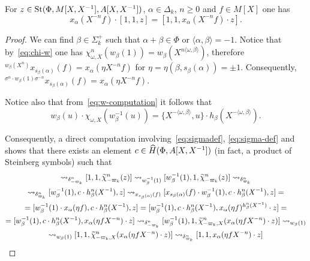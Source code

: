 \begin{lemma} \label{lem:family2}
    For $z \in \operatorname{St}(\Phi, M[X, X^{-1}], A[X, X^{-1}])$, $\alpha \in \Delta_k$, $n \geq 0$ and $f \in M[X]$ one has
    \begin{equation*} x_\alpha(X^{-n} f) \cdot [1, 1, z] = [1, 1, x_\alpha(X^{-n} f) \cdot z]. \end{equation*}
\end{lemma}
\begin{proof}
    We can find $\beta \in \Sigma_k^+$ such that $\alpha + \beta \in \Phi$ or $\langle \alpha, \beta \rangle = -1$.
    Notice that by~\eqref{eq:chi-w} one has $\chi_{\omega, X}^n(w_\beta(1)) = w_\beta(X^{n\langle \omega, \beta \rangle})$, therefore
    ${}^{w_\beta(X^n)} x_{s_\beta(\alpha)}(f) = x_\alpha(\eta X^{-n} f)$
    for $\eta = \eta(\beta, s_\beta(\alpha)) = \pm 1$.
    Consequently, ${}^{\sigma^n \cdot w_\beta(1) \sigma^{-n}} x_{s_\beta(\alpha)}(f) = x_\alpha(\eta X^{-n} f)$.

    Notice also that from~\eqref{eq:w-computation} it follows that
     \[ w_\beta(u) \cdot \chi_{\omega, X}(w^{-1}_\beta(u)) = \{ X^{-\langle \omega, \beta \rangle }, u \} \cdot h_\beta(X^{-\langle \omega, \beta \rangle}). \]

    Consequently, a direct computation involving~\eqref{eq:sigmadef}, \eqref{eq:sigma-def} and~\cite[Lemme~5.1--5.2]{Ma69} shows that there exists an element $c \in \widehat{H}(\Phi, A[X, X^{-1}])$
     (in fact, a product of Steinberg symbols) such that
    \begin{multline*}
        [1, 1, z] \rightsquigarrow_{\delta_{-\varpi_k}^n}
        [1, 1, \widetilde{\chi}_{-\varpi_k}^n(z)] \rightsquigarrow_{w^{-1}_\beta(1)}
        [w_\beta^{-1}(1), 1, \widetilde{\chi}_{-\varpi_k}^n(z)] \rightsquigarrow_{\delta_{\varpi_k}^n} \\
        \rightsquigarrow_{\delta_{\varpi_k}^n} [w_\beta^{-1}(1), c \cdot h_\beta^n(X^{-1}), z] \rightsquigarrow_{x_{s_\beta(\alpha)}(f)}
        [x_{s_\beta(\alpha)}(f) \cdot w_\beta^{-1}(1), c \cdot h_\beta^n(X^{-1}), z] = \\
        = [w_\beta^{-1}(1) \cdot x_{\alpha}(\eta f), c \cdot h_\beta^n(X^{-1}), z] =
          [w_\beta^{-1}(1), c \cdot h_\beta^n(X^{-1}), x_{\alpha}(\eta f)^{h_\beta^n(X^{-1})} \cdot z] = \\
        = [w_\beta^{-1}(1), c \cdot h_\beta^n(X^{-1}), x_{\alpha}(\eta fX^{-n}) \cdot z] \rightsquigarrow_{\delta_{-\varpi_k}^n}
          [w_\beta^{-1}(1), 1, \widetilde{\chi}_{-\varpi_k, X}^n (x_{\alpha}(\eta fX^{-n}) \cdot z)] \rightsquigarrow_{ w_\beta(1) } \\
        \rightsquigarrow_{ w_\beta(1) } [1, 1, \widetilde{\chi}_{-\varpi_k, X}^n (x_{\alpha}(\eta fX^{-n}) \cdot z)] \rightsquigarrow_{\delta_{\varpi_k}^n}
          [1, 1, x_{\alpha}(\eta fX^{-n}) \cdot z] \qedhere
    \end{multline*}
\end{proof}

